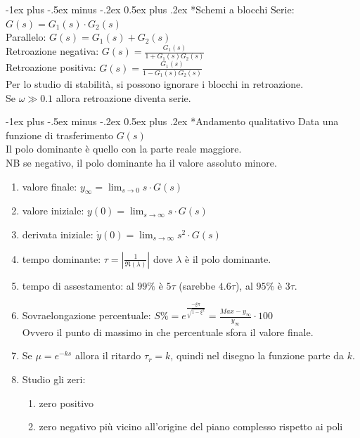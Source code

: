 \documentclass[10pt,landscape, a4paper]{scrartcl} %
\makeatletter
\renewcommand{\section}{\@startsection{section}{1}{0mm}%
                                {-1ex plus -.5ex minus -.2ex}%
                                {0.5ex plus .2ex}%
                                {\normalfont\large\bfseries}}
\makeatother
\begin{document}
\begin{multicols*}{3}
\section*{Schemi a blocchi}
Serie: $G(s) = G_1(s)\cdot G_2(s)$\\
Parallelo: $G(s) = G_1(s) + G_2(s)$\\
Retroazione negativa: $G(s) = \frac{G_1(s)}{1 + G_1(s)G_2(s)}$\\
Retroazione positiva: $G(s) = \frac{G_1(s)}{1 - G_1(s)G_2(s)}$\\
Per lo studio di stabilità, si possono ignorare i blocchi in retroazione.\\
Se $\omega \gg  0.1$ allora retroazione diventa serie.

\section*{Andamento qualitativo}
Data una funzione di trasferimento $G(s)$\\
Il polo dominante è quello con la parte reale maggiore.\\
NB se negativo, il polo dominante ha il valore assoluto minore.\\
\begin{enumerate}
	\item valore finale: $y_{\infty} = \lim_{s \to 0} s\cdot G(s)$
	\item valore iniziale: $y(0) = \lim_{s \to \infty} s\cdot G(s)$
	\item derivata iniziale: $\dot y(0) = \lim_{s \to \infty} s^2\cdot G(s)$
	\item tempo dominante: $\tau = \left| \frac{1}{\Re(\lambda)}\right|$ dove $\lambda$ è il polo dominante.
	\item tempo di assestamento: al $99\%$ è $5\tau$ (sarebbe $4.6\tau$), al $95\%$ è $3\tau$.
	\item Sovraelongazione percentuale: $S\% = e^{\frac{-\xi \pi}{\sqrt{1 - \xi^2}}} = \frac{Max - y_\infty}{y_\infty} \cdot 100$\\
			Ovvero il punto di massimo in che percentuale sfora il valore finale.
	\item Se $\mu = e^{-k s}$ allora il ritardo $\tau_r = k$, quindi nel disegno la funzione parte da $k$.
	\item Studio gli zeri:
	 \begin{multicols*}{2}
		\begin{enumerate}
			\item zero positivo
			\item zero negativo più vicino all'origine del piano complesso rispetto ai poli

\end{enumerate}
\end{multicols*}
\end{enumerate}
\end{multicols*}
\end{document}
